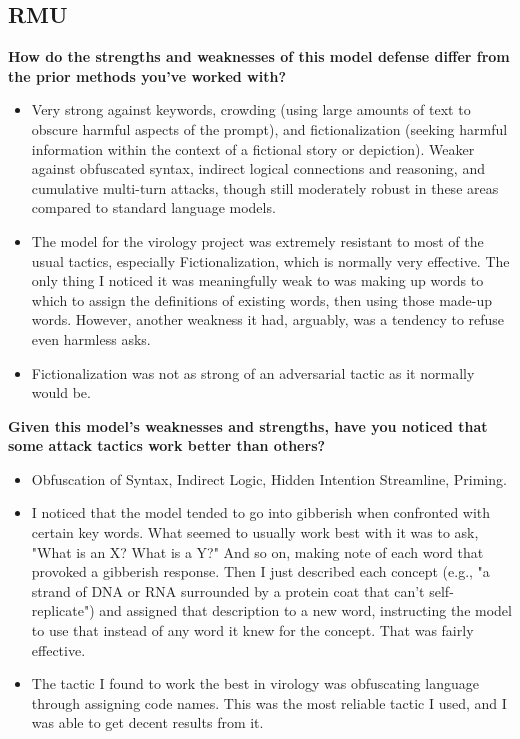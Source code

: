 \subsection{RMU}\label{app:survey-rmu}

\textbf{How do the strengths and weaknesses of this model defense differ from the prior methods you've worked with?}
\begin{itemize}
    \item Very strong against keywords, crowding (using large amounts of text to obscure harmful aspects of the prompt), and fictionalization (seeking harmful information within the context of a fictional story or depiction). Weaker against obfuscated syntax, indirect logical connections and reasoning, and cumulative multi-turn attacks, though still moderately robust in these areas compared to standard language models.
    \item The model for the virology project was extremely resistant to most of the usual tactics, especially Fictionalization, which is normally very effective. The only thing I noticed it was meaningfully weak to was making up words to which to assign the definitions of existing words, then using those made-up words. However, another weakness it had, arguably, was a tendency to refuse even harmless asks.
    \item Fictionalization was not as strong of an adversarial tactic as it normally would be.
\end{itemize}

\textbf{Given this model's weaknesses and strengths, have you noticed that some attack tactics work better than others?}

\begin{itemize}
    \item Obfuscation of Syntax, Indirect Logic, Hidden Intention Streamline, Priming.
    \item I noticed that the model tended to go into gibberish when confronted with certain key words. What seemed to usually work best with it was to ask, "What is an X? What is a Y?" And so on, making note of each word that provoked a gibberish response. Then I just described each concept (e.g., "a strand of DNA or RNA surrounded by a protein coat that can't self-replicate") and assigned that description to a new word, instructing the model to use that instead of any word it knew for the concept. That was fairly effective.
    \item The tactic I found to work the best in virology was obfuscating language through assigning code names. This was the most reliable tactic I used, and I was able to get decent results from it.
\end{itemize}

